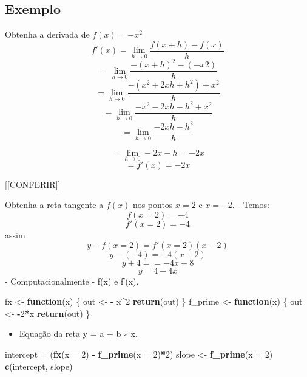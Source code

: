 \documentclass[
]{article}
\newenvironment{Shaded}{\begin{snugshade}}{\end{snugshade}}
\newcommand{\AttributeTok}[1]{\textcolor[rgb]{0.13,0.29,0.53}{#1}}
\newcommand{\ControlFlowTok}[1]{\textcolor[rgb]{0.13,0.29,0.53}{\textbf{#1}}}
\newcommand{\DecValTok}[1]{\textcolor[rgb]{0.00,0.00,0.81}{#1}}
\newcommand{\FunctionTok}[1]{\textcolor[rgb]{0.13,0.29,0.53}{\textbf{#1}}}
\newcommand{\NormalTok}[1]{#1}
\newcommand{\OtherTok}[1]{\textcolor[rgb]{0.56,0.35,0.01}{#1}}
\newcommand{\SpecialCharTok}[1]{\textcolor[rgb]{0.81,0.36,0.00}{\textbf{#1}}}
\providecommand{\tightlist}{%
  \setlength{\itemsep}{0pt}\setlength{\parskip}{0pt}}
\begin{document}
\hypertarget{exemplo}{%
\subsection{Exemplo}\label{exemplo}}

Obtenha a derivada de \(f(x) = -x^2\) \[
f'(x) = \lim_{h \to 0} \frac{f(x + h) - f(x)}{h}
\] \[
= \lim_{h \to 0} \frac{-(x + h)^2 - (-x2)}{h}
\] \[
= \lim_{h \to 0} \frac{-(x^2 + 2xh + h^2) + x^2}{h}
\] \[
= \lim_{h \to 0} \frac{-x^2 - 2xh - h^2 + x^2}{h}
\] \[
= \lim_{h \to 0} \frac{- 2xh - h^2}{h}
\]

\[
= \lim_{h \to 0} - 2x - h = -2x
\] \[
= f′(x) = -2x
\]

{[}{[}CONFERIR{]}{]}

Obtenha a reta tangente a \(f(x)\) nos pontos \(x = 2\) e \(x = -2\). -
Temos: \[f(x = 2) = -4\] \[f′(x = 2) = -4\] assim
\[y - f(x = 2) = f′(x = 2)(x - 2)\] \[y - (-4) = -4(x - 2)\]
\[y + 4 = = -4x + 8\] \[y = 4 - 4x\] - Computacionalmente - f(x) e
f′(x).

\begin{Shaded}
\begin{Highlighting}[]
\NormalTok{fx }\OtherTok{\textless{}{-}} \ControlFlowTok{function}\NormalTok{(x) \{}
\NormalTok{out }\OtherTok{\textless{}{-}} \SpecialCharTok{{-}}\NormalTok{ x}\SpecialCharTok{\^{}}\DecValTok{2}
\FunctionTok{return}\NormalTok{(out)}
\NormalTok{\}}
\NormalTok{f\_prime }\OtherTok{\textless{}{-}} \ControlFlowTok{function}\NormalTok{(x) \{}
\NormalTok{out }\OtherTok{\textless{}{-}} \SpecialCharTok{{-}}\DecValTok{2}\SpecialCharTok{*}\NormalTok{x}
\FunctionTok{return}\NormalTok{(out)}
\NormalTok{\}}
\end{Highlighting}
\end{Shaded}

\begin{itemize}
\tightlist
\item
  Equação da reta y = a + b ∗ x.
\end{itemize}

\begin{Shaded}
\begin{Highlighting}[]
\NormalTok{intercept }\OtherTok{=}\NormalTok{ (}\FunctionTok{fx}\NormalTok{(}\AttributeTok{x =} \DecValTok{2}\NormalTok{) }\SpecialCharTok{{-}} \FunctionTok{f\_prime}\NormalTok{(}\AttributeTok{x =} \DecValTok{2}\NormalTok{)}\SpecialCharTok{*}\DecValTok{2}\NormalTok{)}
\NormalTok{slope }\OtherTok{\textless{}{-}} \FunctionTok{f\_prime}\NormalTok{(}\AttributeTok{x =} \DecValTok{2}\NormalTok{)}
\FunctionTok{c}\NormalTok{(intercept, slope)}
\end{Highlighting}
\end{Shaded}
\end{document}
